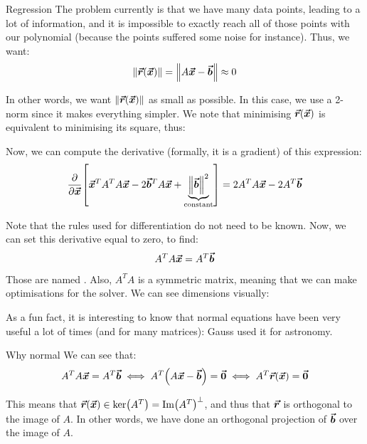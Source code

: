 \documentclass[a4paper]{article}
\begin{document}
\begin{parag}{Regression}
    The problem currently is that we have many data points, leading to a lot of information, and it is impossible to exactly reach all of those points with our polynomial (because the points suffered some noise for instance). Thus, we want: 
    \[\left\|\bvec{r}\left(\bvec{x}\right)\right\| = \left\|A \bvec{x} - \bvec{b}\right\| \approx 0\]
    
    In other words, we want $\left\|\bvec{r}\left(\bvec{x}\right)\right\|$ as small as possible. In this case, we use a 2-norm since it makes everything simpler. We note that minimising $\bvec{r}\left(\bvec{x}\right)$ is equivalent to minimising its square, thus: 


    Now, we can compute the derivative (formally, it is a gradient) of this expression: 
    \[\frac{\partial }{\partial \bvec{x}} \left[\bvec{x}^T A^T A \bvec{x} - 2 \bvec{b}^T A \bvec{x} + \underbrace{\left\|\bvec{b}\right\|^2}_{\text{constant}}\right] = 2 A^T A \bvec{x} - 2 A^T \bvec{b}\]
    
    Note that the rules used for differentiation do not need to be known. Now, we can set this derivative equal to zero, to find: 
    \[A^T A \bm{\protect\vec{x}} = A^T \bm{\protect\vec{b}}\]

    Those are named . Also, $A^T A$ is a symmetric matrix, meaning that we can make optimisations for the solver. We can see dimensions visually:

    As a fun fact, it is interesting to know that normal equations have been very useful a lot of times (and for many matrices): Gauss used it for astronomy.

    \begin{subparag}{Why normal}
        We can see that: 
        \[A^T A \bvec{x} = A^T \bvec{b} \iff A^T\left(A \bvec{x} - \bvec{b}\right) = \bvec{0} \iff A^T \bvec{r}\left(\bvec{x}\right) = \bvec{0}\]

        This means that $\bvec{r}\left(\bvec{x}\right) \in \ker\left(A^T\right) = \im\left(A^T\right)^\perp$, and thus that $\bm{\protect\vec{r}}$ is orthogonal to the image of $A$. In other words, we have done an orthogonal projection of $\bm{\protect\vec{b}}$ over the image of $A$.


\end{subparag}
\end{parag}
\end{document}
